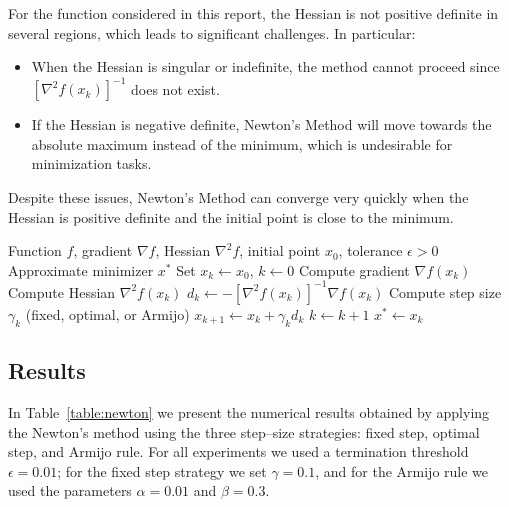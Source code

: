 \documentclass[11pt]{article}
\begin{document}
For the function considered in this report, the Hessian is not positive definite in several regions, which leads to significant challenges. In particular:
\begin{itemize}
    \item When the Hessian is singular or indefinite, the method cannot proceed since $[\nabla^2 f(x_k)]^{-1}$ does not exist.
    \item If the Hessian is negative definite, Newton's Method will move towards the absolute maximum instead of the minimum, which is undesirable for minimization tasks.
\end{itemize}

Despite these issues, Newton's Method can converge very quickly when the Hessian is positive definite and the initial point is close to the minimum.

\begin{algorithm}[H]
\caption{Newton's Method}
\begin{algorithmic}[1]
\Require Function $f$, gradient $\nabla f$, Hessian $\nabla^2 f$, initial point $x_0$, tolerance $\epsilon > 0$
\Ensure Approximate minimizer $x^*$
\State Set $x_k \gets x_0$, $k \gets 0$
    \State Compute gradient $\nabla f(x_k)$
    \State Compute Hessian $\nabla^2 f(x_k)$
    \State $d_k \gets -[\nabla^2 f(x_k)]^{-1} \nabla f(x_k)$ 
    \State Compute step size $\gamma_k$ (fixed, optimal, or Armijo)
    \State $x_{k+1} \gets x_k + \gamma_k d_k$
    \State $k \gets k + 1$
\EndWhile
\State \Return $x^* \gets x_k$
\end{algorithmic}
\end{algorithm}

\subsection{Results}

In Table~\ref{table:newton} we present the numerical results obtained by 
applying the Newton's method using the three step–size strategies: fixed step,
optimal step, and Armijo rule. 
For all experiments we used a termination threshold 
$\epsilon = 0.01$; for the fixed step strategy we set $\gamma = 0.1$, and for the Armijo
rule we used the parameters $\alpha = 0.01$ and $\beta = 0.3$.
\end{document}
